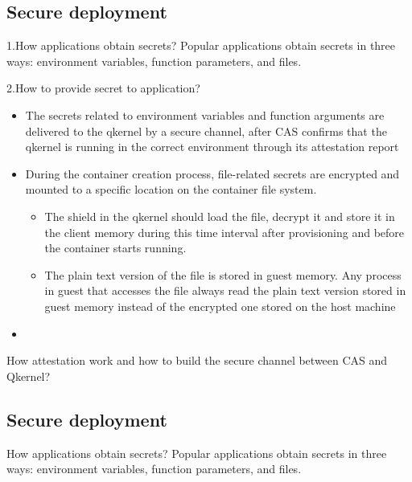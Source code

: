 \subsection{Secure deployment}

1.How applications obtain secrets?
Popular applications obtain secrets in three ways: environment variables, function parameters, and files.

2.How to provide secret to application?
\begin{itemize}
    \item  The secrets related to environment variables and function arguments are  delivered to the qkernel by a secure channel, after CAS confirms that the qkernel is running in the correct environment through its attestation report
    \item  During the container creation process, file-related secrets are encrypted and mounted to a specific location on the container file system.
    \begin{itemize}
        \item The shield in the qkernel should load the file, decrypt it and store it in the client memory during this time interval after provisioning and before the container starts running.
        \item The plain text version of the file is stored in guest memory. Any process in guest that accesses the file always read the plain text version stored in guest memory instead of the encrypted one stored on the host machine
      \end{itemize}
    \item
\end{itemize}

How attestation work and how to build the secure channel between CAS and Qkernel?


\subsection{Secure deployment}

How applications obtain secrets?
Popular applications obtain secrets in three ways: environment variables, function parameters, and files.

